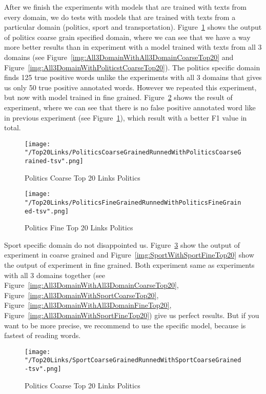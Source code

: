 \documentclass[thesis=M,english]{FITthesis}[2018/05/30]
\begin{document}
	After we finish the experiments with models that are trained with texts from every domain, we do tests with models that are trained with texts from a particular domain (politics, sport and transportation).
	Figure~\ref{img:PoliticsWithPoliticsCoarseTop20} shows the output of politics coarse grain specified domain, where we can see that we have a way more better results than in experiment with a model trained with texts from all 3 domains (see Figure~\ref{img:All3DomainWithAll3DomainCoarseTop20} and Figure~\ref{img:All3DomainWithPoliticstCoarseTop20}). The politics specific domain finds 125 true positive words unlike the experiments with all 3 domains that gives us only 50 true positive annotated words. However we repeated this experiment, but now with model trained in fine grained. Figure~\ref{img:PoliticsWithPoliticsFineTop20} shows the result of experiment, where we can see that there is no false positive annotated word like in previous experiment (see Figure~\ref{img:PoliticsWithPoliticsCoarseTop20}), which result with a better F1 value in total.  
	\begin{figure}[H]\centering
		\texttt{[image: "/Top20Links/PoliticsCoarseGrainedRunnedWithPoliticsCoarseGrained-tsv".png]}
		\caption{Politics Coarse Top 20 Links Politics}\label{img:PoliticsWithPoliticsCoarseTop20}
	\end{figure}	

	\begin{figure}[H]\centering
		\texttt{[image: "/Top20Links/PoliticsFineGrainedRunnedWithPoliticsFineGrained-tsv".png]}
		\caption{Politics Fine Top 20 Links Politics}\label{img:PoliticsWithPoliticsFineTop20}
	\end{figure}

	Sport specific domain do not disappointed us. Figure~\ref{img:SportWithSportCoarseTop20} show the output of experiment in coarse grained and Figure~\ref{img:SportWithSportFineTop20} show the output of experiment in fine grained. Both experiment same as experiments with all 3 domains together (see Figure~\ref{img:All3DomainWithAll3DomainCoarseTop20}, Figure~\ref{img:All3DomainWithSportCoarseTop20}, Figure~\ref{img:All3DomainWithAll3DomainFineTop20}, Figure~\ref{img:All3DomainWithSportFineTop20}) give us perfect results. But if you want to be more precise, we recommend to use the specific model, because is fastest of reading words.  
	\begin{figure}[H]\centering
		\texttt{[image: "/Top20Links/SportCoarseGrainedRunnedWithSportCoarseGrained-tsv".png]}
		\caption{Politics Coarse Top 20 Links Politics}\label{img:SportWithSportCoarseTop20}
	\end{figure}		
\end{document}

